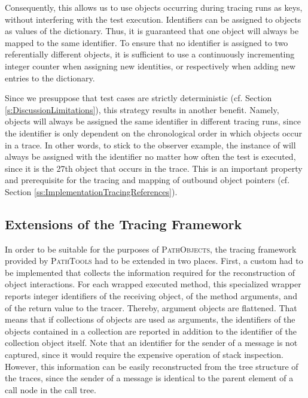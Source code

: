 Consequently, this allows us to use objects occurring during tracing runs as keys, without interfering with the test execution.
Identifiers can be assigned to objects as values of the dictionary.
Thus, it is guaranteed that one object will always be mapped to the same identifier.
To ensure that no identifier is assigned to two referentially different objects, it is sufficient to use a continuously incrementing integer counter when assigning new identities, or respectively when adding new entries to the dictionary.

Since we presuppose that test cases are strictly deterministic (cf. Section \ref{s:DiscussionLimitations}), this strategy results in another benefit.
Namely, objects will always be assigned the same identifier in different tracing runs, since the identifier is only dependent on the chronological order in which objects occur in a trace.
In other words, to stick to the observer example, the instance of  will always be assigned with the identifier  no matter how often the test is executed, since it is the 27th object that occurs in the trace.
This is an important property and prerequisite for the tracing and mapping of outbound object pointers (cf. Section \ref{ss:ImplementationTracingReferences}).

\subsection{Extensions of the Tracing Framework}
\label{ss:ImplementationTracing}
In order to be suitable for the purposes of \textsc{PathObjects}, the tracing framework provided by \textsc{PathTools} had to be extended in two places.
First, a custom  had to be implemented that collects the information required for the reconstruction of object interactions.
For each wrapped executed method, this specialized wrapper reports integer identifiers of the receiving object, of the method arguments, and of the return value to the tracer.
Thereby, argument objects are flattened.
That means that if collections of objects are used as arguments, the identifiers of the objects contained in a collection are reported in addition to the identifier of the collection object itself.
Note that an identifier for the sender of a message is not captured, since it would require the expensive operation of stack inspection.
However, this information can be easily reconstructed from the tree structure of the traces, since the sender of a message is identical to the parent element of a call node in the call tree.

